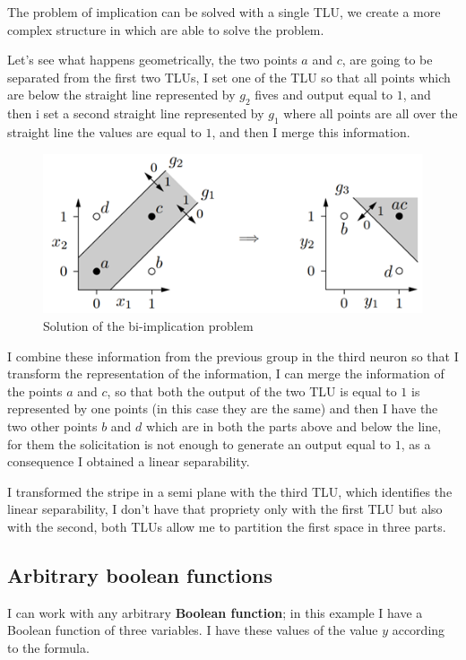 \documentclass{article}
\begin{document}
The problem of implication can be solved with a single TLU, we create a more complex structure
in which are able to solve the problem.

Let’s see what happens geometrically, the two points $a$ and $c$, are going to be separated
from the first two  TLUs, I set one of the TLU so that all points which are below the straight
line represented by $g_2$ fives and output equal to $1$, and then i set a second straight line
represented by $g_1$ where all points are all over the straight line the values are equal to $1$,
and then I merge this information.

\begin{figure}[H]
    \includegraphics[scale=0.8]{images/sol_bi_implic_problem_graph.png}
    \centering
    \caption{Solution of the bi-implication problem}
\end{figure}

I combine these information from the previous group in the third neuron so that I transform
the representation of the information, I can merge the information of the points $a$ and $c$,
so that both the output of the two TLU is equal to $1$ is represented by one points (in this case
they are the same) and then I have the two other points $b$ and $d$ which are in both the parts
above and below the line, for them the solicitation is not enough to generate an output
equal to $1$, as a consequence I obtained a linear separability.

I transformed the stripe in a semi plane with the third TLU, which identifies the linear
separability, I don’t have that propriety only with the first TLU but also with the second,
both TLUs allow me to partition the first space in three parts.

\subsection{Arbitrary boolean functions}
I can work with any arbitrary \textbf{Boolean function}; in this example I have a
Boolean function of three variables. I have these values of the value $y$ according to the formula.
\end{document}
